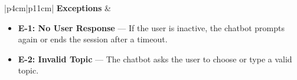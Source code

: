 \begin{table}[h!]
\begin{tabular}{|p{4cm}|p{11cm}|}
\textbf{Exceptions} &
\begin{minipage}[t]{\linewidth}
\begin{itemize}[nosep,leftmargin=*]
\setlength\itemsep{0pt}
    \item \textbf{E-1: No User Response} — If the user is inactive, the chatbot prompts again or ends the session after a timeout.
    \item \textbf{E-2: Invalid Topic} — The chatbot asks the user to choose or type a valid topic.
\end{itemize}
\vspace{2pt}
\end{minipage}
\\ \hline

\end{tabular}
\caption{UC-10: Chatbot Interview Conversation}
\end{table}
